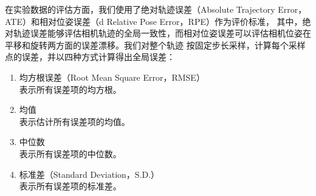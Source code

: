 在实验数据的评估方面，我们使用了绝对轨迹误差（Absolute Trajectory Error，ATE）和相对位姿误差（d Relative Pose Error，RPE）作为评价标准，
其中，绝对轨迹误差能够评估相机轨迹的全局一致性，而相对位姿误差可以评估相机位姿在平移和旋转两方面的误差漂移。我们对整个轨迹
按固定步长采样，计算每个采样点的误差，并以四种方式计算得出全局误差：
{
\setlist[enumerate]{}%
\begin{enumerate}[nosep]
    \item 均方根误差（Root Mean Square Error，RMSE）\citep{pathak2016context}\\表示所有误差项的均方根。
    \item 均值\\表示估计所有误差项的均值。
    \item 中位数\\表示所有误差项的中位数。
    \item 标准差（Standard Deviation，S.D.）\\表示所有误差项的标准差。
\end{enumerate}
}
